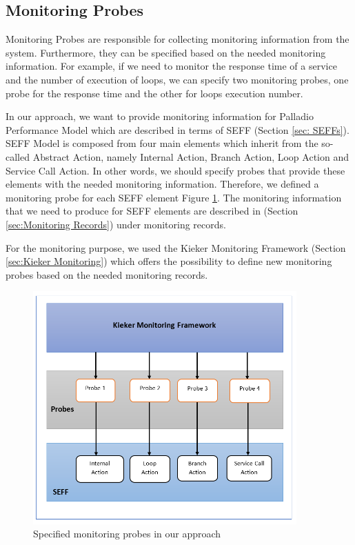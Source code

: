 \subsection{Monitoring Probes}
\label{sec:Monitoring Probes}
Monitoring Probes are responsible for collecting monitoring information from the system. Furthermore, they can be specified based on the needed monitoring information. For example, if we need to monitor the response time of a service and the number of execution of loops, we can specify two monitoring probes, one probe for the response time and the other for loops execution number. 

In our approach, we want to provide monitoring information for Palladio Performance Model which are described in terms of SEFF (Section \ref{sec: SEFFs}).   SEFF Model is composed from four main elements which inherit from the so-called Abstract Action, namely Internal Action, Branch Action, Loop Action and Service Call Action. In other words, we should specify probes that provide these elements with the needed monitoring information. Therefore, we defined a monitoring probe for each SEFF element Figure \ref{fig:Specified Monitoring Probes in our Approach}. The monitoring information that we need to produce for SEFF elements are described in (Section \ref{sec:Monitoring Records}) under monitoring records.  

For the monitoring purpose, we used the Kieker Monitoring Framework (Section \ref{sec:Kieker Monitoring}) which offers the possibility to define new monitoring probes based on the needed monitoring records.

\begin{figure}[h]
\centering
\includegraphics[width=0.9\textwidth]{figures/probes}
\caption{Specified monitoring probes in our approach}
\label{fig:Specified Monitoring Probes in our Approach}
\end{figure}

